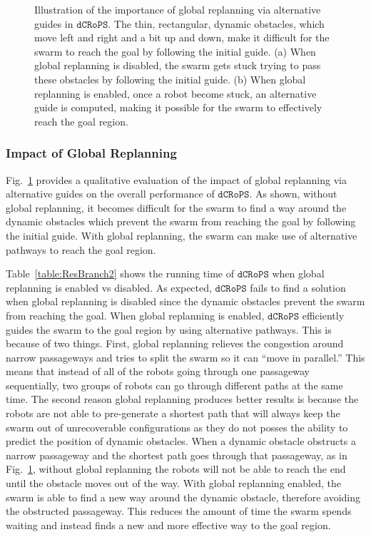 \documentclass[letterpaper, 10pt, conference]{ieeeconf}
\newcommand{\Acronym}[1]{\ensuremath{{{\texttt{#1}}}}}
\newcommand{\Name}{\Acronym{dCRoPS}}
\begin{document}
\begin{figure}
\caption{Illustration of the importance of global replanning via
  alternative guides in $\Name$.
The thin, rectangular, dynamic obstacles, which move left and right and a
bit up and down, make it difficult for the swarm
to reach the goal by following the initial guide.
(a) When global replanning is disabled, the swarm gets stuck trying to pass
these obstacles by following the initial guide.
(b) When global replanning is enabled, once a robot become stuck,  an
alternative guide is computed, making it possible for the swarm to
effectively reach the goal region.}
\label{fig:ResBranch1}
\end{figure}


\subsubsection{Impact of Global Replanning}



Fig.~\ref{fig:ResBranch1} provides a qualitative evaluation of the
impact of global replanning via alternative guides on the overall
performance of $\Name$. As shown, without global replanning, it 
becomes difficult for the swarm to find a way around the dynamic
obstacles which prevent the swarm from reaching the goal by
following the initial guide. With global replanning, the swarm can
make use of alternative pathways to reach the goal region.

Table~\ref{table:ResBranch2} shows the running time of $\Name$ when
global replanning is enabled vs disabled. As expected, $\Name$ fails
to find a solution when global replanning is disabled since the
dynamic obstacles prevent the swarm from reaching the goal. When
global replanning is enabled, $\Name$ efficiently guides the swarm to
the goal region by using alternative pathways.  This is because of two
things.  First, global replanning relieves the congestion around
narrow passageways and tries to split the swarm so it can ``move in
parallel.'' This means that instead of all of the robots going through
one passageway sequentially, two groups of robots can go through
different paths at the same time. The second reason global replanning
produces better results is because the robots are not able to
pre-generate a shortest path that will always keep the swarm out of
unrecoverable configurations as they do not posses the ability to
predict the position of dynamic obstacles.  When a dynamic
obstacle obstructs a narrow passageway and the shortest path goes
through that passageway, as in
Fig.~\ref{fig:ResBranch1}, without global replanning the robots will
not be able to reach the end until the obstacle moves out of the
way. With global replanning enabled, the swarm is able to find a new
way around the dynamic obstacle, therefore avoiding the obstructed
passageway. This reduces the amount of time the swarm spends waiting
and instead finds a new and more effective way to the goal region. 
\end{document}
